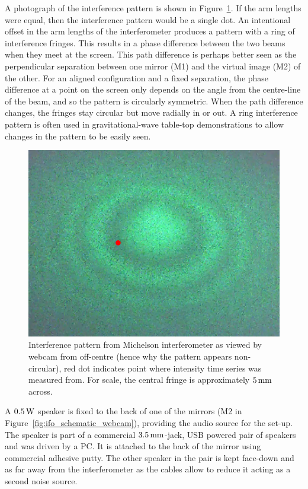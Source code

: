 \documentclass[paper-main.tex]{subfiles}
\begin{document}
A photograph of the interference pattern is shown in Figure~\ref{fig:interference_pattern}. 
If the arm lengths were equal, then the interference pattern would be a single dot. 
An intentional offset in the arm lengths of the interferometer produces a pattern with a ring of interference fringes. 
This results in a phase difference between the two beams when they meet at the screen. This path difference is perhaps better seen as the perpendicular separation between one mirror (M1) and the virtual image (M2\textquotesingle) of the other. For an aligned configuration and a fixed separation, the phase difference at a point on the screen only depends on the angle from the centre-line of the beam, and so the pattern is circularly symmetric. When the path difference changes, the fringes stay circular but move radially in or out.
A ring interference pattern is often used in gravitational-wave table-top demonstrations to allow changes in the pattern to be easily seen. 


\begin{figure}
 \begin{center}
  \includegraphics[width=.45\textwidth]{figures/webcam_still0_crop.pdf}
 \end{center}
 \caption{\label{fig:interference_pattern}
 Interference pattern from Michelson interferometer as viewed by webcam from off-centre (hence why the pattern appears non-circular), red dot indicates point where intensity time series was measured from. For scale, the central fringe is approximately $5\,{\rm mm}$ across.}
\end{figure}


A $0.5\,{\rm W}$ speaker is fixed to the back of one of the mirrors (M2 in Figure~\ref{fig:ifo_schematic_webcam}), providing the audio source for the set-up. 
The speaker is part of a commercial $3.5\,{\rm mm}$-jack, USB powered pair of speakers and was driven by a PC. 
It is attached to the back of the mirror using commercial adhesive putty. 
The other speaker in the pair is kept face-down and as far away from the interferometer as the cables allow to reduce it acting as a second noise source. 
\end{document}
